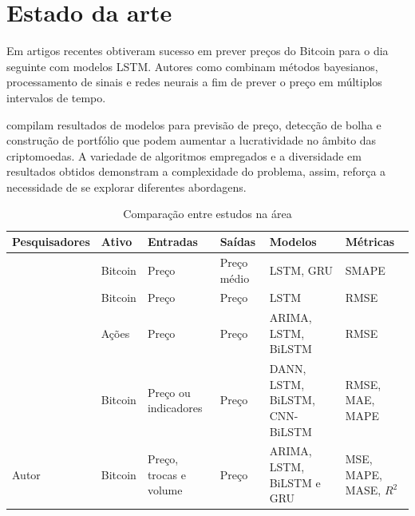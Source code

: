 

\section{Estado da arte} \label{sec:estado}

Em artigos recentes \textcite{Fer} obtiveram sucesso em prever preços do Bitcoin para o dia seguinte com modelos LSTM. Autores como \textcite{Tri} combinam métodos bayesianos, processamento de sinais e redes neurais a fim de prever o preço em múltiplos intervalos de tempo.

\textcite{Zhang} compilam resultados de modelos para previsão de preço, detecção de bolha e construção de portfólio que podem aumentar a lucratividade no âmbito das criptomoedas.
A variedade de algoritmos empregados e a diversidade em resultados obtidos demonstram a complexidade do problema, assim, reforça a necessidade de se explorar diferentes abordagens.

\begin{table}[!htb]
  \scriptsize
  \caption{Comparação entre estudos na área} \label{tabela:lista_estudos}
  \begin{tabularx}{\textwidth}{l|X|X|X|X|X} \hline
    Pesquisadores & Ativo & Entradas & Saídas & Modelos & Métricas \\ \hline
    \cite{lstmvsgru} & Bitcoin & Preço & Preço médio & LSTM, GRU & SMAPE \\ \hline
    \cite{Fer} & Bitcoin & Preço & Preço & LSTM & RMSE \\ \hline
    \cite{Siami} & Ações & Preço & Preço& ARIMA, LSTM, BiLSTM & RMSE \\ \hline
    \cite{Tri} & Bitcoin & Preço ou indicadores& Preço & DANN, LSTM, BiLSTM, CNN-BiLSTM & RMSE, MAE, MAPE \\ \hline
    Autor & Bitcoin & Preço, trocas e volume & Preço & ARIMA, LSTM, BiLSTM e GRU & MSE, MAPE, MASE, $R^2$ \\ \hline
  \end{tabularx}
\end{table}
